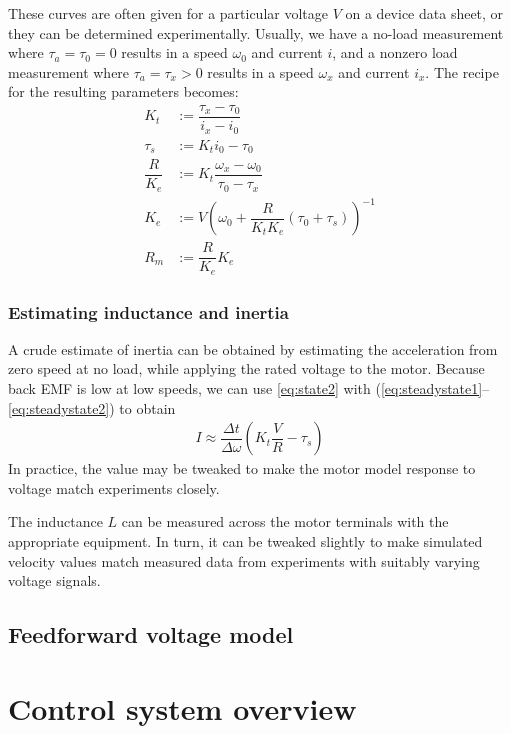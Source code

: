 \documentclass[12pt, a4paper]
{article}
\providecommand{\lr}[1]{\left(#1\right)}
\providecommand{\w}{\omega}
\providecommand{\w}{\omega}
\begin{document}
These curves are often given for a particular voltage $V$ on a device data
sheet, or they can be determined experimentally. Usually, we have a no-load
measurement where $\tau_a = \tau_0 = 0$ results in a speed $\w_0$ and current
$i$, and a nonzero load measurement where $\tau_a = \tau_x > 0$ results in a
speed $\w_x$ and current $i_x$. The recipe for the resulting parameters
becomes:
%
\begin{align}
    \label{eq:recipe}
    K_t &:= \dfrac{\tau_x - \tau_0}{i_x - i_0}\\[1em]
    \tau_s &:= K_t i_0 -  \tau_0\\[1em]
    \dfrac{R}{K_e} &:= K_t\dfrac{\w_x - \w_0}{\tau_0 - \tau_x}\\[1em]
    K_e &:= V \lr{\w_0 + \dfrac{R}{K_t K_e} \lr{ \tau_0 + \tau_s}}^{-1}\\[1em]
    R_m &:= \dfrac{R}{K_e} K_e
\end{align}


\subsubsection{Estimating inductance and inertia}

A crude estimate of inertia can be obtained by estimating the acceleration
from zero speed at no load, while applying the rated voltage to the motor.
Because back EMF is low at low speeds, we can use \eqref{eq:state2} with
(\ref{eq:steadystate1}--\ref{eq:steadystate2}) to obtain
%
\begin{align}
    I  \approx \dfrac{\Delta t}{\Delta \w} (K_t \dfrac{V}{R} - \tau_s)
\end{align}
%
In practice, the value may be tweaked to make the motor model response to
voltage match experiments closely.

The inductance $L$ can be measured across
the motor terminals with the appropriate equipment. In turn, it can be tweaked
slightly to make simulated velocity values match measured data from
experiments with suitably varying voltage signals.

\subsection{Feedforward voltage model}

\section{Control system overview}
\end{document}
